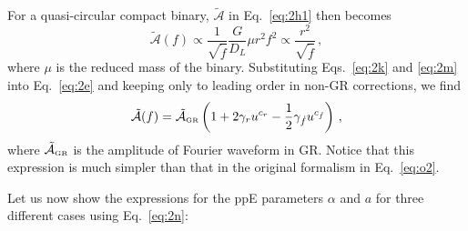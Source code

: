 \documentclass[prd,twocolumn,nofootinbib]{revtex4-1}
\newcommand{\GR}{{\mbox{\tiny GR}}}
\begin{document}
For a quasi-circular compact binary, $\tilde{\mathcal{A}}$ in Eq.~\eqref{eq:2h1} then becomes
\begin{equation}\label{eq:2e}
\tilde{\mathcal{A}}(f) \propto\frac{1}{\sqrt{\dot{f}}}\frac{G}{D_L}\mu r^2f^2 \propto \frac{r^2}{\sqrt{\dot{f}}}  \,,
\end{equation}
where $\mu$ is the reduced mass of the binary.
Substituting Eqs.~\eqref{eq:2k} and \eqref{eq:2m} into Eq.~\eqref{eq:2e} and keeping only to leading order in non-GR corrections, we find
\begin{equation}\label{eq:2n}
\tilde{\mathcal{A}}(f)=\tilde{\mathcal{A}}_{\GR} \left(1+2\gamma_ru^{c_r}-\frac{1}{2}\gamma_{\dot{f}}u^{c_{\dot{f}}}\right)\,,
\end{equation}
where $\tilde{\mathcal{A}}_{\GR} $ is the amplitude of Fourier waveform in GR. Notice that this expression is much simpler than that in the original formalism in Eq.~\eqref{eq:o2}.

Let us now show the expressions for the ppE parameters $\alpha$ and $a$ for three different cases using Eq.~\eqref{eq:2n}:
\end{document}
